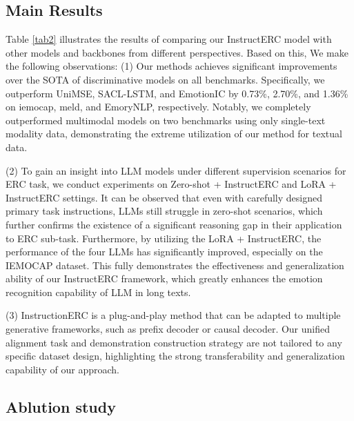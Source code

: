 \documentclass[conference]{IEEEtran}
\begin{document}
\subsection{Main Results}
Table \ref{tab2} illustrates the results of comparing our InstructERC model with other models and backbones from different perspectives. Based on this, We make the following observations: (1) Our methods achieves significant improvements over the SOTA of discriminative models on all benchmarks. Specifically, we outperform UniMSE, SACL-LSTM, and EmotionIC by 0.73\%, 2.70\%, and 1.36\% on iemocap, meld, and EmoryNLP, respectively. Notably, we completely outperformed multimodal models on two benchmarks using only single-text modality data, demonstrating the extreme utilization of our method for textual data.

(2) To gain an insight into LLM models under different supervision scenarios for ERC task, we conduct experiments on Zero-shot + InstructERC and LoRA + InstructERC settings. It can be observed that even with carefully designed primary task instructions, LLMs still struggle in zero-shot scenarios, which further confirms the existence of a significant reasoning gap in their application to ERC sub-task.
Furthermore, by utilizing the LoRA + InstructERC, the performance of the four LLMs has significantly improved, especially on the IEMOCAP dataset. This fully demonstrates the effectiveness and generalization ability of our InstructERC framework, which greatly enhances the emotion recognition capability of LLM in long texts.

(3) InstructionERC is a plug-and-play method that can be adapted to multiple generative frameworks, such as prefix decoder or causal decoder. Our unified alignment task and demonstration construction strategy are not tailored to any specific dataset design, highlighting the strong transferability and generalization capability of our approach.


\subsection{Ablution study}
\end{document}
